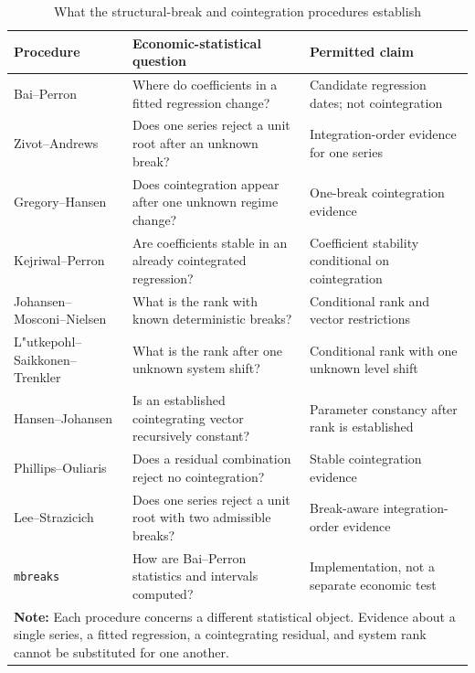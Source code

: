 \begin{table}[h!]
\centering\scriptsize
\caption{What the structural-break and cointegration procedures establish}
\label{tab:method-map}
\begin{tabular}{p{3.3cm}p{4.6cm}p{5.0cm}}
\toprule
\textbf{Procedure} & \textbf{Economic-statistical question} & \textbf{Permitted claim}\\
\midrule
Bai--Perron & Where do coefficients in a fitted regression change? & Candidate regression dates; not cointegration \\
Zivot--Andrews & Does one series reject a unit root after an unknown break? & Integration-order evidence for one series \\
Gregory--Hansen & Does cointegration appear after one unknown regime change? & One-break cointegration evidence \\
Kejriwal--Perron & Are coefficients stable in an already cointegrated regression? & Coefficient stability conditional on cointegration \\
Johansen--Mosconi--Nielsen & What is the rank with known deterministic breaks? & Conditional rank and vector restrictions \\
L"utkepohl--Saikkonen--Trenkler & What is the rank after one unknown system shift? & Conditional rank with one unknown level shift \\
Hansen--Johansen & Is an established cointegrating vector recursively constant? & Parameter constancy after rank is established \\
Phillips--Ouliaris & Does a residual combination reject no cointegration? & Stable cointegration evidence \\
Lee--Strazicich & Does one series reject a unit root with two admissible breaks? & Break-aware integration-order evidence \\
\texttt{mbreaks} & How are Bai--Perron statistics and intervals computed? & Implementation, not a separate economic test \\
\bottomrule
\multicolumn{3}{p{13.1cm}}{\footnotesize \textbf{Note:} Each procedure concerns a different statistical object. Evidence about a single series, a fitted regression, a cointegrating residual, and system rank cannot be substituted for one another.}
\end{tabular}
\end{table}
